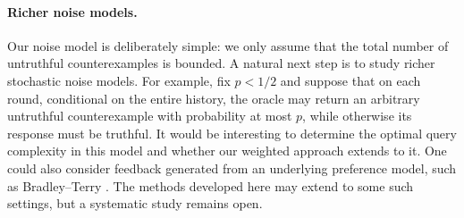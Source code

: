 \documentclass[11pt]{article}
\theoremstyle{definition}
\theoremstyle{remark}
\begin{document}
\paragraph{Richer noise models.}
Our noise model is deliberately simple: we only assume that the total number
of untruthful counterexamples is bounded. A natural next step is to study
richer stochastic noise models. For example, fix $p<1/2$ and suppose that
on each round, conditional on the entire history, the oracle may return an
arbitrary untruthful counterexample with probability at most $p$, while
otherwise its response must be truthful. It would be interesting to
determine the optimal query complexity in this model and whether our
weighted approach extends to it. One could also consider feedback generated
from an underlying preference model, such as Bradley--Terry
\cite{BradleyTerry1952}. The methods developed here may extend to some such
settings, but a systematic study remains open.




\end{document}
